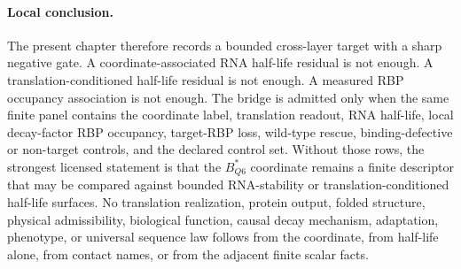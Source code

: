 \paragraph{Local conclusion.}
The present chapter therefore records a bounded cross-layer target with a sharp negative gate. A coordinate-associated RNA half-life residual is not enough. A translation-conditioned half-life residual is not enough. A measured RBP occupancy association is not enough. The bridge is admitted only when the same finite panel contains the coordinate label, translation readout, RNA half-life, local decay-factor RBP occupancy, target-RBP loss, wild-type rescue, binding-defective or non-target controls, and the declared control set. Without those rows, the strongest licensed statement is that the $B^{\ast}_{Q6}$ coordinate remains a finite descriptor that may be compared against bounded RNA-stability or translation-conditioned half-life surfaces. No translation realization, protein output, folded structure, physical admissibility, biological function, causal decay mechanism, adaptation, phenotype, or universal sequence law follows from the coordinate, from half-life alone, from contact names, or from the adjacent finite scalar facts.